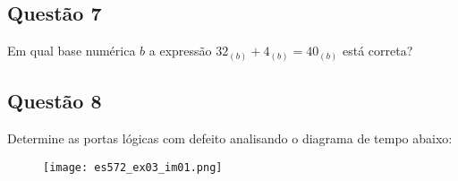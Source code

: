\documentclass{article}
\begin{document}
        \subsection{Questão 7}
            \begin{exercise}
                Em qual base numérica $b$ a expressão $32_{(b)} + 4_{(b)} = 40_{(b)}$ está correta?
            \end{exercise}
            \begin{resolution}

            \end{resolution}
\newpage

        \subsection{Questão 8}
            \begin{exercise}
                Determine as portas lógicas com defeito analisando o diagrama de tempo abaixo:
                    \begin{figure}[H]
                        \centering
                        \texttt{[image: es572\_ex03\_im01.png]}
                    \end{figure} \noindent
            \end{exercise}
            \begin{resolution}

            \end{resolution}
\end{document}
